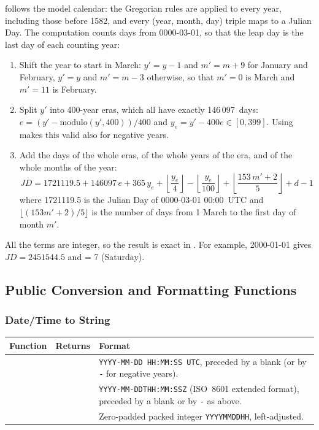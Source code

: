  follows the model calendar: the Gregorian rules are
applied to every year, including those before 1582, and every
(year, month, day) triple maps to a Julian Day. The computation counts
days from 0000-03-01, so that the leap day is the last day of each
counting year:
\begin{enumerate}
  \item Shift the year to start in March: $y' = y - 1$ and $m' = m + 9$ for
        January and February, $y' = y$ and $m' = m - 3$ otherwise, so that
        $m' = 0$ is March and $m' = 11$ is February.
  \item Split $y'$ into 400-year eras, which all have exactly
        146\,097~days: $e = (y' - \text{modulo}(y', 400))/400$ and
        $y_e = y' - 400e \in [0, 399]$. Using  makes this valid
        also for negative years.
  \item Add the days of the whole eras, of the whole years of the era, and
        of the whole months of the year:
        \[
          JD = 1721119.5 + 146097\,e + 365\,y_e
               + \left\lfloor \frac{y_e}{4} \right\rfloor
               - \left\lfloor \frac{y_e}{100} \right\rfloor
               + \left\lfloor \frac{153\,m' + 2}{5} \right\rfloor
               + d - 1
        \]
        where 1721119.5 is the Julian Day of 0000-03-01 00:00~UTC and
        $\lfloor (153m'+2)/5 \rfloor$ is the number of days from 1 March
        to the first day of month $m'$.
\end{enumerate}
All the terms are integer, so the result is exact in . For
example, 2000-01-01 gives $JD = 2451544.5$ and  = 7
(Saturday).

\subsection{Public Conversion and Formatting Functions}
\label{subsec:date_conversion}

\subsubsection{Date/Time to String}

\begin{longtable}{L{4cm} L{4cm} L{6cm}}
  \toprule
  \textbf{Function} & \textbf{Returns} & \textbf{Format} \\
  \midrule
  \endhead
  \bottomrule
  \endfoot
   &
     &
    \texttt{YYYY-MM-DD HH:MM:SS UTC}, preceded by a blank (or by
    \texttt{-} for negative years). \\
   &
     &
    \texttt{YYYY-MM-DDTHH:MM:SSZ} (ISO~8601 extended format), preceded by
    a blank or by \texttt{-} as above. \\
   &
     &
    Zero-padded packed integer \texttt{YYYYMMDDHH}, left-adjusted. \\
\end{longtable}

